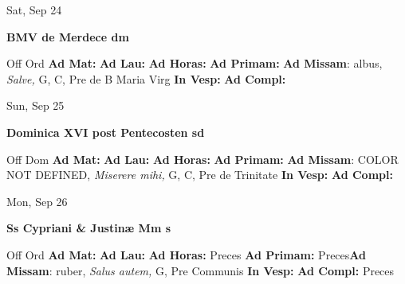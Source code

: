 \documentclass[10pt]{memoir}
\begin{document}
\begin{center}
\begin{minipage}{3.5in}
\vspace{2em}
\begin{center}Sat, Sep 24
\end{center}
\textbf{ \large BMV de Merdece
\textnormal{\normalsize dm}}

\begin{justify}Off Ord
\textbf{Ad Mat: }
\textbf{Ad Lau: }
\textbf{Ad Horas: }
\textbf{Ad Primam: }\textbf{Ad Missam}: albus, \textit{Salve,} G, C, Pre de B Maria Virg
\textbf{In Vesp: }
\textbf{Ad Compl: }
\end{justify}
\end{minipage}
\end{center}

\begin{center}
\begin{minipage}{3.5in}
\vspace{2em}
\begin{center}Sun, Sep 25
\end{center}
\textbf{ \large Dominica XVI post Pentecosten
\textnormal{\normalsize sd}}

\begin{justify}Off Dom
\textbf{Ad Mat: }
\textbf{Ad Lau: }
\textbf{Ad Horas: }
\textbf{Ad Primam: }\textbf{Ad Missam}: COLOR NOT DEFINED, \textit{Miserere mihi,} G, C, Pre de Trinitate
\textbf{In Vesp: }
\textbf{Ad Compl: }
\end{justify}
\end{minipage}
\end{center}

\begin{center}
\begin{minipage}{3.5in}
\vspace{2em}
\begin{center}Mon, Sep 26
\end{center}
\textbf{ \large Ss Cypriani \& Justinæ Mm
\textnormal{\normalsize s}}

\begin{justify}Off Ord
\textbf{Ad Mat: }
\textbf{Ad Lau: }
\textbf{Ad Horas: }Preces
\textbf{Ad Primam: }Preces\textbf{Ad Missam}: ruber, \textit{Salus autem,} G, Pre Communis
\textbf{In Vesp: }
\textbf{Ad Compl: }Preces
\end{justify}
\end{minipage}
\end{center}
\end{document}

